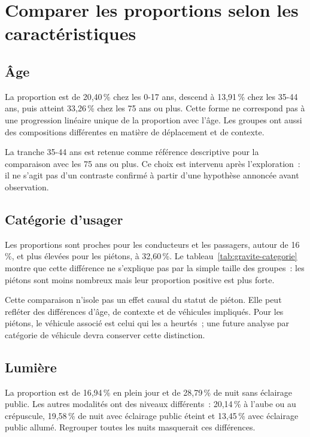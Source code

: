 \section{Comparer les proportions selon les caractéristiques}
\subsection{Âge}
La proportion est de 20,40\,\% chez les 0-17 ans, descend à 13,91\,\% chez les 35-44 ans,
puis atteint 33,26\,\% chez les 75 ans ou plus. Cette forme ne correspond pas à une
progression linéaire unique de la proportion avec l'âge. Les groupes ont aussi des
compositions différentes en matière de déplacement et de contexte.


La tranche 35-44 ans est retenue comme référence descriptive pour la comparaison
avec les 75 ans ou plus. Ce choix est intervenu après l'exploration~: il ne s'agit pas
d'un contraste confirmé à partir d'une hypothèse annoncée avant observation.
\FloatBarrier

\subsection{Catégorie d'usager}
Les proportions sont proches pour les conducteurs et les passagers, autour de 16\,\%,
et plus élevées pour les piétons, à 32,60\,\%. Le tableau~\ref{tab:gravite-categorie}
montre que cette différence ne s'explique pas par la simple taille des groupes~:
les piétons sont moins nombreux mais leur proportion positive est plus forte.


Cette comparaison n'isole pas un effet causal du statut de piéton. Elle peut refléter
des différences d'âge, de contexte et de véhicules impliqués. Pour les piétons, le
véhicule associé est celui qui les a heurtés~; une future analyse par catégorie de
véhicule devra conserver cette distinction.
\FloatBarrier

\subsection{Lumière}
La proportion est de 16,94\,\% en plein jour et de 28,79\,\% de nuit sans éclairage
public. Les autres modalités ont des niveaux différents~: 20,14\,\% à l'aube ou au
crépuscule, 19,58\,\% de nuit avec éclairage public éteint et 13,45\,\% avec éclairage
public allumé. Regrouper toutes les nuits masquerait ces différences.


